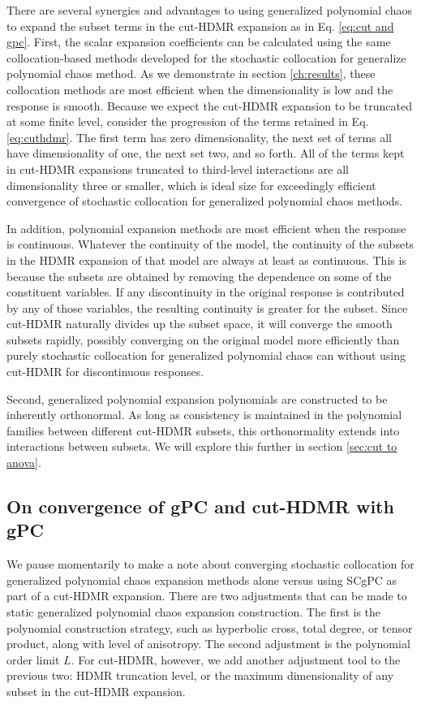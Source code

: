 There are several synergies and advantages to using generalized polynomial chaos to expand the subset terms in
the cut-HDMR expansion as in Eq. \ref{eq:cut and gpc}.  First, the scalar expansion coefficients can be calculated using the same
collocation-based methods developed for the stochastic collocation for generalize polynomial chaos method.  
As we demonstrate in section \ref{ch:results},
these collocation methods are most efficient when the dimensionality is low and the response is smooth.
Because we expect the cut-HDMR expansion to be truncated at some finite level, consider the progression of the
terms retained in Eq. \ref{eq:cuthdmr}. The first term has zero dimensionality, the next set of terms all have
dimensionality of one, the next set two, and so forth.  All of the terms kept in cut-HDMR expansions
truncated to third-level interactions are all dimensionality three or smaller, which is ideal size for
exceedingly efficient convergence of stochastic collocation for generalized polynomial chaos methods. 

In
addition, polynomial expansion methods are most efficient when the response is continuous.  Whatever the
continuity of the model, the continuity of the subsets in the HDMR expansion of that model are always at
least as continuous.  This is because the subsets are obtained by removing the dependence on some of the
constituent variables.  If any discontinuity in the original response is contributed by any of those variables,
the resulting continuity is greater for the subset.
Since cut-HDMR naturally divides up the subset space, it will
converge the smooth subsets rapidly, possibly converging on the original model more efficiently than purely
stochastic collocation for generalized polynomial chaos can without using cut-HDMR for discontinuous responses.

Second, generalized polynomial expansion polynomials are constructed to be inherently orthonormal.  As long as
consistency is maintained in the polynomial families between different cut-HDMR subsets, this orthonormality
extends into interactions between subsets.  We will explore this further in section \ref{sec:cut to anova}.

\subsection{On convergence of gPC and cut-HDMR with gPC}
We pause momentarily to make a note about converging stochastic collocation for generalized polynomial chaos
expansion methods alone versus using SCgPC as part of a cut-HDMR expansion.  There are two adjustments that
can be made to static generalized polynomial chaos expansion construction.  The first is the polynomial
construction strategy, such as hyperbolic cross, total degree, or tensor product, along with level of
anisotropy.  The second adjustment is the polynomial order limit $L$.  For cut-HDMR, however, we add another
adjustment tool to the previous two: HDMR truncation level, or the maximum dimensionality of any subset in
the cut-HDMR expansion.


